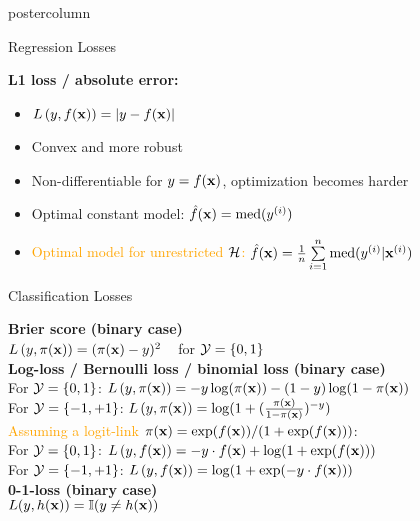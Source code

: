 \documentclass{beamer}
\begin{document}
\begin{frame}[fragile]{}
\begin{columns}
\begin{column}{.31\textwidth}
\begin{beamercolorbox}[center]{postercolumn}
\begin{minipage}{.98\textwidth}
{\begin{myblock}{Regression Losses}
\vspace*{1ex}


  \textbf{L1 loss / absolute error:} 
\begin{itemize}
\setlength{\itemindent}{+.3in}
  \item $L\left(y, f(\mathbf{x})\right) = |y-f(\mathbf{x})|$
  \item Convex and more robust
  \item Non-differentiable for $y = f(\mathbf{x})$, optimization becomes harder
  \item Optimal constant model: $\hat{f}(\mathbf{x}) = \text{med}(y^{(i)})$
  \item \textcolor{orange}{Optimal model for unrestricted $\mathcal{H}$: $\hat{f}(\mathbf{x}) = \frac{1}{n} \sum\limits_{i=1}^n \text{med}(y^{(i)} | \mathbf{x}^{(i)})$}
\end{itemize}
\end{myblock}


\begin{myblock}{Classification Losses}


\textbf{Brier score (binary case)} \\
$L\left(y, \pi(\mathbf{x})\right) = (\pi(\mathbf{x}) - y)^2$ ~ for $\mathcal{Y} = \{0, 1\}$ \\

\textbf{Log-loss / Bernoulli loss / binomial loss (binary case)}\\
For $\mathcal{Y} = \{0, 1\}$: $L\left(y, \pi(\mathbf{x})\right) = -y \log(\pi(\mathbf{x})) - (1-y) \log(1-\pi(\mathbf{x}))$ \\
For $\mathcal{Y} = \{-1, +1\}$: $L\left(y, \pi(\mathbf{x})\right) = \log(1 + (\frac{\pi(\mathbf{x})}{1-\pi(\mathbf{x})})^{-y})$ \\
\textcolor{orange}{Assuming a logit-link $\pi(\mathbf{x}) = \exp(f(\mathbf{x})) / ( 1+\exp(f(\mathbf{x})))$}:\\
For $\mathcal{Y} = \{0, 1\}$: $L\left(y, f(\mathbf{x})\right) = -y \cdot f(\mathbf{x}) + \log(1 + \exp(f(\mathbf{x})))$ \\
For $\mathcal{Y} = \{-1, +1\}$: $L\left(y, f(\mathbf{x})\right) = \log(1 + \exp(- y \cdot f(\mathbf{x})))$ \\

\textbf{0-1-loss (binary case)}\\
\textcolor{orange}{ $L (y, h(\mathbf{x})) = \mathbb{I}(y \neq h(\mathbf{x}))$}\\


\end{myblock}}
\end{minipage}
\end{beamercolorbox}
\end{column}
\end{columns}
\end{frame}
\end{document}
